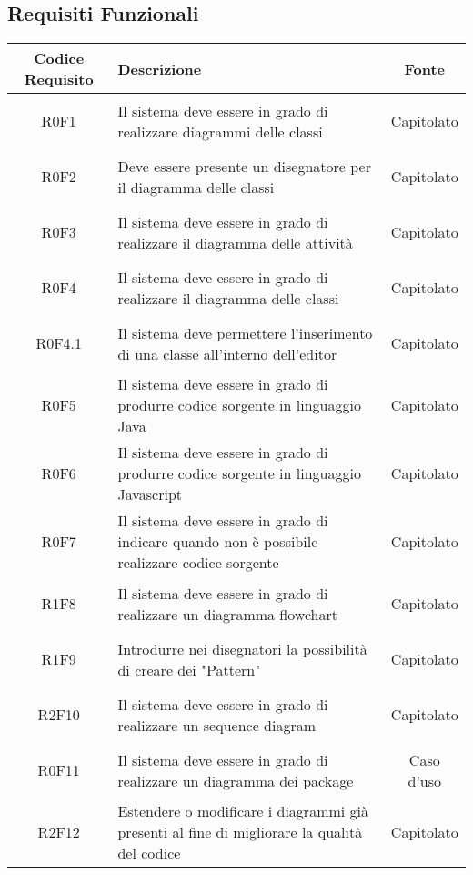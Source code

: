 \documentclass[../AnalisiDeiRequisiti.tex]{subfiles}
\begin{document}
\newpage
\subsection{Requisiti Funzionali}
\normalsize
\begin{longtable}{|c|>{\centering}p{7cm}|c|}
	\hline
	\textbf{Codice Requisito} & \textbf{Descrizione} & \textbf{Fonte}\\
	\hline
	\endhead
	\hypertarget{R0F1}{R0F1} & Il sistema deve essere in grado di realizzare diagrammi delle classi & Capitolato \\ \hline
	\hypertarget{R0F2}{R0F2} & Deve essere presente un disegnatore per il diagramma delle classi & Capitolato \\ \hline
	\hypertarget{R0F3}{R0F3} & Il sistema deve essere in grado di realizzare il diagramma delle attività & Capitolato \\ \hline
	\hypertarget{R0F4}{R0F4} & Il sistema deve essere in grado di realizzare il diagramma delle classi & Capitolato \\ \hline
	\hypertarget{R0F4.1}{R0F4.1} & Il sistema deve permettere l'inserimento di una classe all'interno dell'editor & Capitolato \\ \hline
	\hypertarget{R0F5}{R0F5} & Il sistema deve essere in grado di produrre codice sorgente in linguaggio Java & Capitolato \\ \hline
	\hypertarget{R0F6}{R0F6} & Il sistema deve essere in grado di produrre codice sorgente in linguaggio Javascript & Capitolato \\ \hline
	\hypertarget{R0F7}{R0F7} & Il sistema deve essere in grado di indicare quando non è possibile realizzare codice sorgente & Capitolato \\ \hline
	\hypertarget{R1F8}{R1F8} & Il sistema deve essere in grado di realizzare un diagramma flowchart & Capitolato \\ \hline
	\hypertarget{R1F9}{R1F9} & Introdurre nei disegnatori la possibilità di creare dei "Pattern" & Capitolato \\ \hline
	\hypertarget{R2F10}{R2F10} & Il sistema deve essere in grado di realizzare un sequence diagram & Capitolato \\ \hline
	\hypertarget{R0F11}{R0F11} & Il sistema deve essere in grado di realizzare un diagramma dei package & Caso d'uso \\ \hline
	\hypertarget{R2F12}{R2F12} & Estendere o modificare i diagrammi già presenti al fine di migliorare la qualità del codice & Capitolato \\ \hline

\end{longtable}
\end{document}
